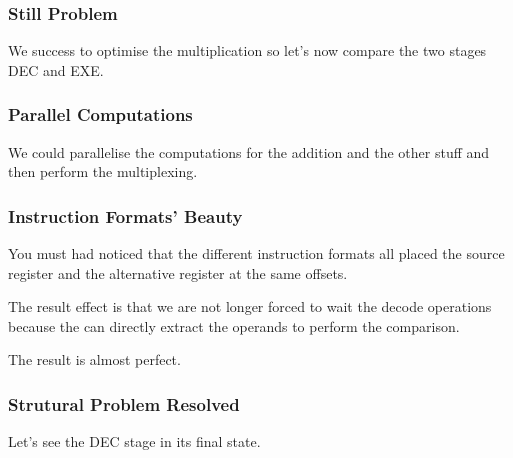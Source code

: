 
\begin{frame}
  \frametitle{Still Problem}

  We success to optimise the multiplication so let's now compare the
  two stages DEC and EXE.

  \begin{center}
  \end{center}
\end{frame}


\begin{frame}
  \frametitle{Parallel Computations}

  We could parallelise the computations for the addition and the
  other stuff and then perform the multiplexing.

  \begin{center}
  \end{center}
\end{frame}


\begin{frame}
  \frametitle{Instruction Formats' Beauty}

  You must had noticed that the different instruction formats all placed
  the source register and the alternative register at the same offsets.

  \-

  The result effect is that we are not longer forced to wait the decode
  operations because the can directly extract the operands to perform
  the comparison.

  \begin{center}
  \end{center}

  The result is almost perfect.
\end{frame}


\begin{frame}
  \frametitle{Strutural Problem Resolved}

  Let's see the DEC stage in its final state.

  \begin{center}
  \end{center}
\end{frame}


